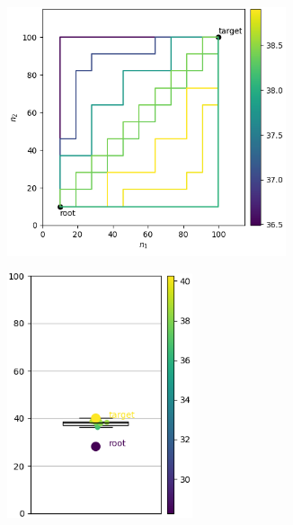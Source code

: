 \documentclass{article}
\begin{document}
\begin{figure}[htbp]
    \centering
    \begin{subfigure}[b]{0.29\textwidth}
        \centering
        \includegraphics[width=0.9\textwidth]{imgs/pathes_CIFAR10_gradmax_2024_05_02_16_13_51.png}
    \end{subfigure}
    \begin{subfigure}[b]{0.29\textwidth}
        \centering
        \includegraphics[width=0.6\textwidth]{imgs/box_plot_CIFAR10_gradmax_2024_05_02_16_13_51.png}
    \end{subfigure}
    

\end{figure}
\end{document}
